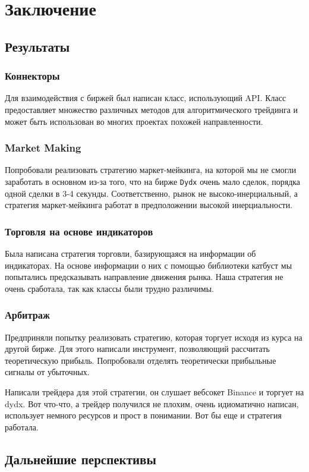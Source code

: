 \section{Заключение}
\subsection{Результаты}
\subsubsection{Коннекторы}
Для взаимодействия с биржей был написан класс, использующий API. Класс предоставляет множество различных методов для алгоритмического трейдинга и может быть использован во многих проектах похожей направленности.
\subsubsection{Market Making}
Попробовали реализовать стратегию маркет-мейкинга, на которой мы не смогли заработать в основном из-за того, что на бирже \texttt{Dydx} очень мало сделок, порядка одной сделки в 3-4 секунды. Соответственно, рынок не высоко-инерциальный, а стратегия маркет-мейкинга работат в предположении высокой инерциальности.
\subsubsection{Торговля на основе индикаторов}
Была написана стратегия торговли, базирующаяся на информации об индикаторах. На основе информации о них с помощью библиотеки катбуст мы попытались предсказывать направление движения рынка. Наша стратегия не очень сработала, так как классы были трудно различимы.
\subsubsection{Арбитраж}
Предприняли попытку реализовать стратегию, которая торгует исходя из курса на другой бирже. Для этого написали инструмент, позволяющий рассчитать теоретическую прибыль. Попробовали отделять теоретически прибыльные сигналы от убыточных. 

Написали трейдера для этой стратегии, он слушает вебсокет Binance и торгует на dydx. Вот что-что, а трейдер получился не плохим, очень идиоматично написан, использует немного ресурсов и прост в понимании. Вот бы еще и стратегия работала.

\subsection{Дальнейшие перспективы}
